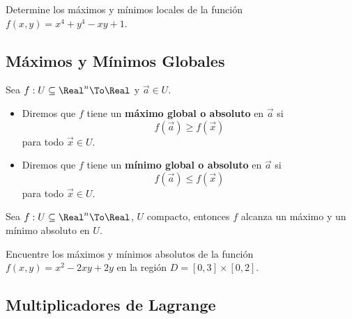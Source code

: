\begin{frame}
  \begin{eg}
    Determine los máximos y mínimos locales de la función $f(x,y)=x^4+y^4-xy+1$.
  \end{eg}
\end{frame}

\subsection{Máximos y Mínimos Globales}
\begin{frame}
\subsectionpage
\end{frame}


\begin{frame}
  \begin{defn}
    Sea $f:U\subseteq\Real^n\To\Real$ y $\vec{a}\in U$.
    \begin{itemize}
      \item Diremos que $f$ tiene un \textbf{máximo global o absoluto} en $\vec{a}$ si
        $$f(\vec{a})\geq f(\vec{x})$$
        para todo $\vec{x}\in U$.\\[0.25cm]
      \item Diremos que $f$ tiene un \textbf{mínimo global o absoluto} en $\vec{a}$ si
        $$f(\vec{a})\leq f(\vec{x})$$
        para todo $\vec{x}\in U$.
    \end{itemize}
  \end{defn}
\end{frame}

\begin{frame}
  \begin{thm}[Weierstrass]
    Sea $f:U\subseteq\Real^n\To\Real$, $U$ compacto, entonces $f$ alcanza un máximo y un mínimo absoluto en $U$.
  \end{thm}
\end{frame}

\begin{frame}
  \begin{eg}
    Encuentre los máximos y mínimos absolutos de la función $f(x,y)=x^2-2xy+2y$ en la región $D=[0,3]\times[0,2]$.
  \end{eg}
\end{frame}

\subsection{Multiplicadores de Lagrange}
\begin{frame}
\subsectionpage
\end{frame}


